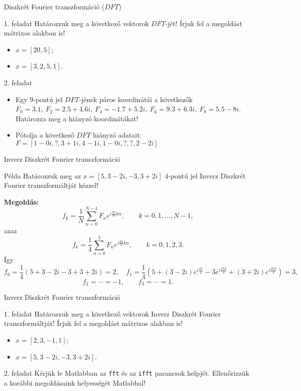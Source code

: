 \documentclass[table]{beamer}
\begin{document}
\begin{frame}[fragile]
{Diszkrét Fourier transzformáció ($DFT$)}

\begin{exampleblock}{1. feladat}
Határozzuk meg a következő vektorok $DFT$-jét! Írjuk fel a megoldást mátrixos alakban is!
\begin{itemize}
\item $x = [20, 5]$;
\item $x = [3, 2, 5, 1]$.
\end{itemize}
\end{exampleblock}

\begin{exampleblock}{2. feladat}
\begin{itemize}
\item Egy $9$-pontú jel $DFT$-jének páros koordinátái a következők
$F_0=3.1,\ F_2=2.5+4.6i,\ F_4=-1.7+5.2i,\ F_6=9.3+6.3i,\ F_8=5.5-8i$. 
Határozza meg a hiányzó koordinátákat!
\item Pótolja a következő $DFT$ hiányzó adatait:
$F=\left[ 1 - 0i, ?, 3 + 1i, 4 - 1i, 1 - 0i, ?, ?, 2 - 2i \right]$
\end{itemize}
\end{exampleblock}
\end{frame}
\begin{frame}[fragile]
{Inverz Diszkrét Fourier transzformáció}
\begin{block}
{Példa}
{Határozzuk meg az $x=[5, 3-2i, -3, 3+2i]$ $4$-pontú jel Inverz Diszkrét Fourier transzformáltját kézzel!
 }
\end{block}
\textbf{Megoldás:}
\[
f_k=\frac1N\sum\limits_{n=0}^{N-1}F_ne^{i\frac{2\pi}{N}kn},\qquad k=0,1,\dots,N-1,
\] 
azaz
\[
f_k=\frac14\sum\limits_{n=0}^{3}F_ne^{i\frac{2\pi}{4}kn},\qquad k=0,1,2,3.
\] 
Így
{\small
\[
f_0=\frac{1}{4}(5+ 3-2i -3+3+2i)=2,\quad f_1=\frac{1}{4}(5+(3-2i)e^{i\frac{2\pi}{4}} -3e^{i\frac{2\pi 2}{4}}+(3+2i)e^{i\frac{2\pi 3}{4}})=3,
\]
\[
f_2=\cdots=-1,\qquad f_3=\cdots=1.
\]}
\end{frame}
\begin{frame}[fragile]
{Inverz  Diszkrét Fourier transzformáció}
\begin{exampleblock}{1. feladat}
Határozzuk meg a következő vektorok Inverz Diszkrét Fourier transzformáltját! Írjuk fel a megoldást mátrixos alakban is!
\begin{itemize}
\item $x = [2, 3, -1, 1]$;
\item $x = [5, 3-2i, -3, 3+2i]$.
\end{itemize}
\end{exampleblock}
\begin{exampleblock}{2. feladat}
Kérjük le Matlabban az \texttt{fft} és az \texttt{ifft} parancsok helpjét. Ellenőrizzük a korábbi megoldásaink helyességét Matlabbal!
\end{exampleblock}
\end{frame}
\end{document}

